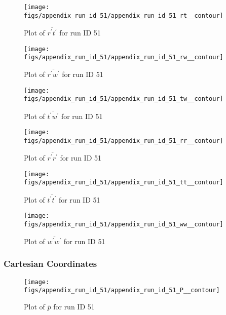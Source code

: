 \begin{figure}[H]
\centering
\texttt{[image: figs/appendix\_run\_id\_51/appendix\_run\_id\_51\_rt\_\_contour]}
\caption{Plot of $\overline{r^\prime t^\prime}$ for run ID 51}
\label{fig:appendix_run_id_51_rt__contour}
\end{figure}


\begin{figure}[H]
\centering
\texttt{[image: figs/appendix\_run\_id\_51/appendix\_run\_id\_51\_rw\_\_contour]}
\caption{Plot of $\overline{r^\prime w^\prime}$ for run ID 51}
\label{fig:appendix_run_id_51_rw__contour}
\end{figure}


\begin{figure}[H]
\centering
\texttt{[image: figs/appendix\_run\_id\_51/appendix\_run\_id\_51\_tw\_\_contour]}
\caption{Plot of $\overline{t^\prime w^\prime}$ for run ID 51}
\label{fig:appendix_run_id_51_tw__contour}
\end{figure}


\begin{figure}[H]
\centering
\texttt{[image: figs/appendix\_run\_id\_51/appendix\_run\_id\_51\_rr\_\_contour]}
\caption{Plot of $\overline{r^\prime r^\prime}$ for run ID 51}
\label{fig:appendix_run_id_51_rr__contour}
\end{figure}


\begin{figure}[H]
\centering
\texttt{[image: figs/appendix\_run\_id\_51/appendix\_run\_id\_51\_tt\_\_contour]}
\caption{Plot of $\overline{t^\prime t^\prime}$ for run ID 51}
\label{fig:appendix_run_id_51_tt__contour}
\end{figure}


\begin{figure}[H]
\centering
\texttt{[image: figs/appendix\_run\_id\_51/appendix\_run\_id\_51\_ww\_\_contour]}
\caption{Plot of $\overline{w^\prime w^\prime}$ for run ID 51}
\label{fig:appendix_run_id_51_ww__contour}
\end{figure}


\subsubsection{Cartesian Coordinates}
\begin{figure}[H]
\centering
\texttt{[image: figs/appendix\_run\_id\_51/appendix\_run\_id\_51\_P\_\_contour]}
\caption{Plot of $\overline{p}$ for run ID 51}
\label{fig:appendix_run_id_51_P__contour}
\end{figure}


